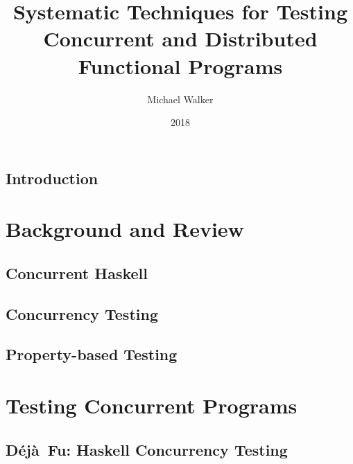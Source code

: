 \documentclass[openright,imperial,11pt]{octavo}
\title{Systematic Techniques for Testing Concurrent and Distributed Functional Programs}
\author{Michael Walker}
\date{\todo{MONTH} 2018}
\newcommand{\dejafu}{D\'{e}j\`{a}~Fu}
\begin{document}
\frontmatter

\pagestyle{plain}

\makeatletter\@openrightfalse\makeatother



\cleardoublepage

\mainmatter

\makeatletter\@openrighttrue\makeatother

\pagestyle{headings}

\chapter{Introduction}
\label{chp:introduction}


\part{Background and Review}
\label{part:review}

\chapter{Concurrent Haskell}
\label{chp:concurrent_haskell}


\chapter{Concurrency Testing}
\label{chp:sct}


\chapter{Property-based Testing}
\label{chp:property_testing}


\part{Testing Concurrent Programs}
\label{part:testing}

\chapter{\dejafu{}: Haskell Concurrency Testing}
\label{chp:dejafu}

\end{document}

